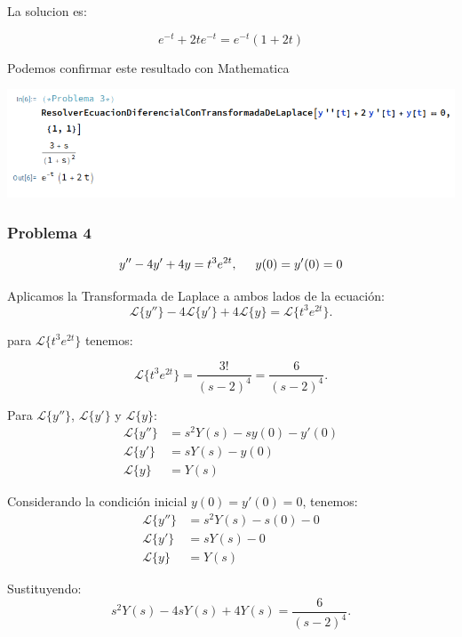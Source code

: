 \documentclass{article}
\begin{document}
La solucion es:

\[e^{-t} + 2te^{-t} = e^{-t}(1+2t)\]

Podemos confirmar este resultado con Mathematica

\begin{center}
    \includegraphics[width=1\textwidth]{../../ED 2/image3.png}
\end{center}

\newpage

\subsubsection{Problema 4}
\[
    y'' - 4y' + 4y = t^{3}e^{2t}, \hspace{.5cm} y(0) = y'(0) = 0
\]

Aplicamos la Transformada de Laplace a ambos lados de la ecuación:
\[
    \mathcal{L}\{y''\} - 4\mathcal{L}\{y'\} + 4\mathcal{L}\{y\} = \mathcal{L}\{t^3e^{2t}\}.
\]

para \(\mathcal{L}\{t^3e^{2t}\}\) tenemos:

\begin{equation*}
    \mathcal{L}\{t^3e^{2t}\} = \frac{3!}{(s-2)^4} = \frac{6}{(s-2)^4}.
\end{equation*}

Para \(\mathcal{L}\{y''\}\), \(\mathcal{L}\{y'\}\) y \(\mathcal{L}\{y\}\):
\begin{align*}
    \mathcal{L}\{y''\} & = s^2Y(s) - sy(0) - y'(0) \\
    \mathcal{L}\{y'\}  & = sY(s) - y(0)            \\
    \mathcal{L}\{y\}   & = Y(s)
\end{align*}

Considerando la condición inicial \(y(0) = y'(0) = 0\), tenemos:
\begin{align*}
    \mathcal{L}\{y''\} & = s^2Y(s) - s(0) - 0 \\
    \mathcal{L}\{y'\}  & = sY(s) - 0          \\
    \mathcal{L}\{y\}   & = Y(s)
\end{align*}

Sustituyendo:
\begin{equation*}
    s^2Y(s) - 4sY(s) + 4Y(s) = \frac{6}{(s-2)^4}.
\end{equation*}
\end{document}
